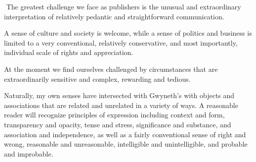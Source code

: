 

﻿
The greatest challenge we face as publishers is the unusual and
extraordinary interpretation of relatively pedantic and
straightforward communication.

A sense of culture and society is welcome, while a sense of politics
and business is limited to a very conventional, relatively
conservative, and most importantly, individual scale of rights and
appreciation.

At the moment we find ourselves challenged by circumstances that are
extraordinarily sensitive and complex, rewarding and tedious.

Naturally, my own senses have intersected with \break Gwyneth's with
objects and associations that are related and unrelated in a variety
of ways.  A reasonable reader will recognize principles of expression
including context and form, transparency and opacity, tense and
stress, significance and substance, and association and independence,
as well as a fairly conventional sense of right and wrong, reasonable
and unreasonable, intelligible and unintelligible, and probable and
improbable.

\bye
